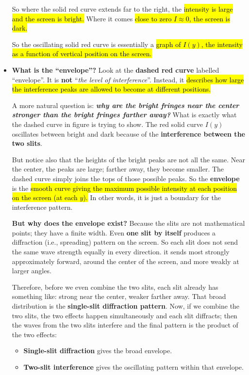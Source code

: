 \begin{deepeningbox}
\begin{itemize}
            So where the solid red curve extends far to the right, the \hl{intensity is large and the screen is bright.} Where it comes \hl{close to zero $I \approx 0$, the screen is dark.}

            So the oscillating solid red curve is essentially a \hl{graph of $I(y)$, the intensity as a function of vertical position on the screen.}

        \item[\textcolor{Green3}{\faIcon{question-circle}}] \textcolor{Green3}{\textbf{What is the ``envelope''?}} Look at the \textbf{dashed red curve} labelled ``envelope''. It is \textbf{not} ``\emph{the level of interference}''. Instead, it \hl{describes how large the interference peaks are allowed to become at different positions.}

            A more natural question is: \textbf{\emph{why are the bright fringes near the center stronger than the bright fringes farther away?}} What is exactly what the dashed curve in figure is trying to show. The red solid curve $I(y)$ oscillates between bright and dark because of the \textbf{interference between the two slits}.

            But notice also that the heights of the bright peaks are not all the same. Near the center, the peaks are large; farther away, they become smaller. The dashed curve simply joins the tops of those possible peaks. So the \textbf{envelope} is the \hl{smooth curve giving the maximum possible intensity at each position on the screen (at each $y$).} In other words, it is just a boundary for the interference pattern.

            \textcolor{Green3}{ \textbf{But why does the envelope exist?}} Because the slits are not mathematical points; they have a finite width. Even \textbf{one slit by itself} produces a diffraction (i.e., spreading) pattern on the screen. So each slit does not send the same wave strength equally in every direction. it sends most strongly approximately forward, around the center of the screen, and more weakly at larger angles.

            Therefore, before we even combine the two slits, each slit already has something like: strong near the center, weaker farther away. That broad distribution is the \textbf{single-slit diffraction pattern}. Now, if we combine the two slits, the two effects happen simultaneously and each slit diffracts; then the waves from the two slits interfere and the final pattern is the product of the two effects:
            \begin{itemize}
                \item \textbf{Single-slit diffraction} gives the broad envelope.
                \item \textbf{Two-slit interference} gives the oscillating pattern within that envelope.
            \end{itemize}
    \end{itemize}
\end{deepeningbox}

